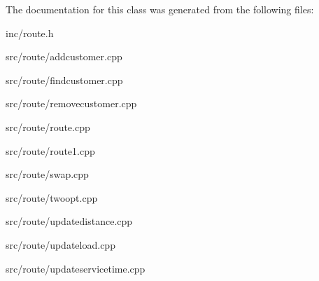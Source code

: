 The documentation for this class was generated from the following files\+:\begin{DoxyCompactItemize}
\item 
inc/route.\+h\item 
src/route/addcustomer.\+cpp\item 
src/route/findcustomer.\+cpp\item 
src/route/removecustomer.\+cpp\item 
src/route/route.\+cpp\item 
src/route/route1.\+cpp\item 
src/route/swap.\+cpp\item 
src/route/twoopt.\+cpp\item 
src/route/updatedistance.\+cpp\item 
src/route/updateload.\+cpp\item 
src/route/updateservicetime.\+cpp\end{DoxyCompactItemize}
